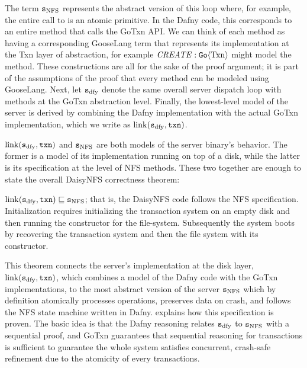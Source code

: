 The term $\texttt{s}_{\mathrm{NFS}}$ represents the abstract version of this loop where, for example,
the entire call to  is an atomic primitive. In the Dafny code,
this corresponds to an entire method that calls the GoTxn API. We can think of
each method as having a corresponding GooseLang term that represents its
implementation at the Txn layer of abstraction, for example
$\mathit{CREATE} : \mathtt{Go}\langle \mathrm{Txn} \rangle$ might model the  method.
These constructions are all for the sake of the proof argument; it is part of
the assumptions of the proof that every method can be modeled using GooseLang.
Next, let $\texttt{s}_{\mathrm{dfy}}$ denote the same overall server dispatch loop with
methods at the GoTxn abstraction level. Finally, the lowest-level model of the
server is derived by combining the Dafny implementation with the actual GoTxn
implementation, which we write as $\mathrm{link}(\texttt{s}_{\mathrm{dfy}}, \texttt{txn})$.

$\mathrm{link}(\texttt{s}_{\mathrm{dfy}}, \texttt{txn})$ and $\texttt{s}_{\mathrm{NFS}}$ are both models of the  server binary's
behavior. The former is a model of its implementation running on top of a disk,
while the latter is its specification at the level of NFS methods. These two
together are enough to state the overall DaisyNFS correctness theorem:
%
\begin{theorem} $\mathrm{link}(\texttt{s}_{\mathrm{dfy}}, \texttt{txn}) \sqsubseteq \texttt{s}_{\mathrm{NFS}}$; that is, the
  DaisyNFS code follows the NFS specification.
  Initialization requires initializing the
  transaction system on an empty disk and then running the 
  constructor for the file-system. Subsequently the system boots by recovering the
  transaction system and then the file system with its  constructor.
  \label{thm:daisy}
\end{theorem}

This theorem connects the server's implementation at the disk layer,
$\mathrm{link}(\texttt{s}_{\mathrm{dfy}}, \texttt{txn})$, which combines a model of the Dafny code with the GoTxn
implementations, to the most abstract version of the server $\texttt{s}_{\mathrm{NFS}}$ which by
definition atomically processes operations, preserves data on crash, and follows
the NFS state machine written in Dafny.  explains how this
specification is proven. The basic idea is that the Dafny reasoning relates
$\texttt{s}_{\mathrm{dfy}}$ to $\texttt{s}_{\mathrm{NFS}}$ with a sequential proof, and GoTxn guarantees that sequential
reasoning for transactions is sufficient to guarantee the whole system satisfies
concurrent, crash-safe refinement due to the atomicity of every transactions.
